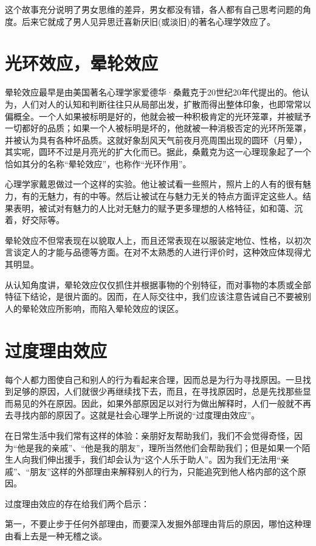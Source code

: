 \documentclass[11pt]{ctexart}
\begin{document}
这个故事充分说明了男女思维的差异，男女都没有错，各人都有自己思考问题的角度。后来它就成了男人见异思迁喜新厌旧(或淡旧)的著名心理学效应了。
\section{光环效应，晕轮效应}
\label{sec-41}


晕轮效应最早是由美国著名心理学家爱德华·桑戴克于20世纪20年代提出的。他认为，人们对人的认知和判断往往只从局部出发，扩散而得出整体印象，也即常常以偏概全。一个人如果被标明是好的，他就会被一种积极肯定的光环笼罩，并被赋予一切都好的品质；如果一个人被标明是坏的，他就被一种消极否定的光环所笼罩，并被认为具有各种坏品质。这就好象刮风天气前夜月亮周围出现的圆环（月晕），其实呢，圆环不过是月亮光的扩大化而已。据此，桑戴克为这一心理现象起了一个恰如其分的名称“晕轮效应”，也称作“光环作用”。

心理学家戴恩做过一个这样的实验。他让被试看一些照片，照片上的人有的很有魅力，有的无魅力，有的中等。然后让被试在与魅力无关的特点方面评定这些人。结果表明，被试对有魅力的人比对无魅力的赋予更多理想的人格特征，如和蔼、沉着，好交际等。

晕轮效应不但常表现在以貌取人上，而且还常表现在以服装定地位、性格，以初次言谈定人的才能与品德等方面。在对不太熟悉的人进行评价时，这种效应体现得尤其明显。

从认知角度讲，晕轮效应仅仅抓住并根据事物的个别特征，而对事物的本质或全部特征下结论，是很片面的。因而，在人际交往中，我们应该注意告诫自己不要被别人的晕轮效应所影响，而陷入晕轮效应的误区。
\section{过度理由效应}
\label{sec-42}


每个人都力图使自己和别人的行为看起来合理，因而总是为行为寻找原因。一旦找到足够的原因，人们就很少再继续找下去，而且，在寻找原因时，总是先找那些显而易见的外在原因。因此，如果外部原因足以对行为做出解释时，人们一般就不再去寻找内部的原因了。这就是社会心理学上所说的“过度理由效应”。

在日常生活中我们常有这样的体验：亲朋好友帮助我们，我们不会觉得奇怪，因为“他是我的亲戚”、“他是我的朋友”，理所当然他们会帮助我们；但是如果一个陌生人向我们伸出援手，我们却会认为“这个人乐于助人”。因为我们无法用“亲戚”、“朋友”这样的外部理由来解释别人的行为，只能追究到他人格内部的这个原因。

过度理由效应的存在给我们两个启示：

第一，不要止步于任何外部理由，而要深入发掘外部理由背后的原因，哪怕这种理由看上去是一种无稽之谈。
\end{document}

